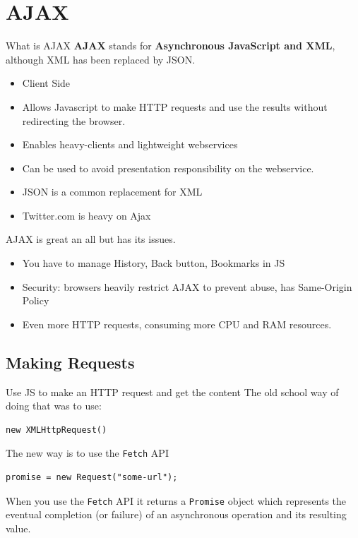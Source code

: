 \documentclass[../CMPUT-404-Notes.tex]{subfiles}
\begin{document}
\chapter{AJAX}

\begin{DndSidebar}[color=PhbLightGreen]{What is AJAX}
    \textbf{AJAX} stands for \textbf{Asynchronous JavaScript and XML}, although XML has been replaced by JSON.

    \begin{itemize}
        \item Client Side
        \item Allows Javascript to make HTTP requests and use the results without redirecting the browser.
        \item Enables heavy-clients and lightweight webservices
        \item Can be used to avoid presentation responsibility on the webservice.
        \item JSON is a common replacement for XML
        \item Twitter.com is heavy on Ajax
    \end{itemize}
\end{DndSidebar}

AJAX is great an all but has its issues.
\begin{itemize}
    \item You have to manage History, Back button, Bookmarks in JS
    \item Security: browsers heavily restrict AJAX to prevent abuse, has Same-Origin Policy
    \item Even more HTTP requests, consuming more CPU and RAM resources.
\end{itemize}

\section{Making Requests}
Use JS to make an HTTP request and get the content
The old school way of doing that was to use:
\begin{verbatim}
new XMLHttpRequest()
\end{verbatim}
The new way is to use the \texttt{Fetch} API
\begin{verbatim}
promise = new Request("some-url");
\end{verbatim}

When you use the \texttt{Fetch} API it returns a \texttt{Promise} object which represents the eventual completion (or failure) of an asynchronous operation and its resulting value.
\end{document}
